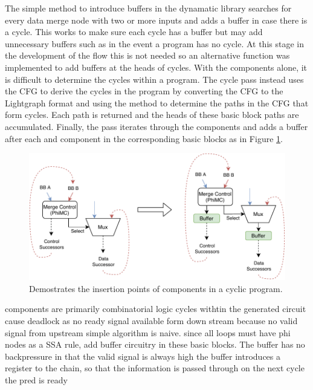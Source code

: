 The simple method to introduce buffers in the dynamatic library searches for every data merge node with two or more inputs and adds a buffer in case there is a cycle. This works to make sure each cycle has a buffer but may add unnecessary buffers such as in the event a program has no cycle. At this stage in the development of the flow this is not needed so an alternative function was implemented to add buffers at the heads of cycles. With the components alone, it is difficult to determine the cycles within a program. The cycle pass instead uses the CFG to derive the cycles in the program by converting the CFG to the Lightgraph \cite{julia_lightgrph} format and using the  method to determine the paths in the CFG that form cycles. Each path is returned and the heads of these basic block paths are accumulated. Finally, the pass iterates through the components and adds a buffer after each  and  component in the corresponding basic blocks as in Figure \ref{fig:buffer_pass}.

\begin{figure}[htb!]
    \centering
    \includegraphics[width=\textwidth]{Images/cycle_pass.pdf}
    \caption{Demostrates the insertion points of  components in a cyclic program.}
    \label{fig:buffer_pass}
\end{figure}

\iffalse
components are primarily combinatorial logic
	cycles withtin the generated circuit cause deadlock as no ready signal available form down stream because no valid signal from upstream
	simple algorithm is naive. since all loops must have phi nodes as a SSA rule, add buffer circuitry in these basic blocks. The buffer has no backpressure in that the valid signal is always high
	the buffer introduces a register to the chain, so that the information is passed through on the next cycle the pred is ready
	
